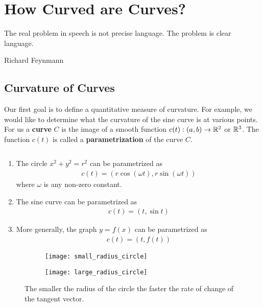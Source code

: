 
\section{How Curved are Curves?}
\epigraph{The real problem in speech is not precise language. The problem is clear language.}{Richard Feynmann}
\subsection{Curvature of Curves}
Our first goal is to define a quantitative measure of curvature. For example, we would like to determine what the curvature of the sine curve is at various points. For us a \textbf{curve} $ C$ is the image of a smooth function $ c(t): (a,b) \rightarrow \mathbb{R}^2$ or $ \mathbb{R}^3$. The function $ c(t)$ is called a \textbf{parametrization} of the curve $ C$.
\begin{example} $ $
	\label{example:parametrizations}
	\begin{enumerate}
		\item The circle $ x^2 + y^2 = r^2$ can be parametrized as \begin{align*}
			      c(t) = (r \cos (\omega t), r \sin(\omega t))
		      \end{align*}
		      where $ \omega$ is any non-zero constant.
		\item The sine curve can be parametrized as
		      \begin{align*}
			      c(t) = (t, \sin t)
		      \end{align*}
		\item More generally, the graph $ y=f(x)$ can be parametrized as
		      \begin{align*}
			      c(t) = (t,f(t))
		      \end{align*}
	\end{enumerate}
\end{example}


\begin{figure}[H]
	\centering
	\begin{subfigure}[t]{0.4\textwidth}
		\centering
		\texttt{[image: small\_radius\_circle]}
	\end{subfigure}
	\begin{subfigure}[t]{0.59\textwidth}
		\centering
		\texttt{[image: large\_radius\_circle]}
	\end{subfigure}
	\caption{The smaller the radius of the circle the faster the rate of change of the tangent vector.}
\end{figure}

